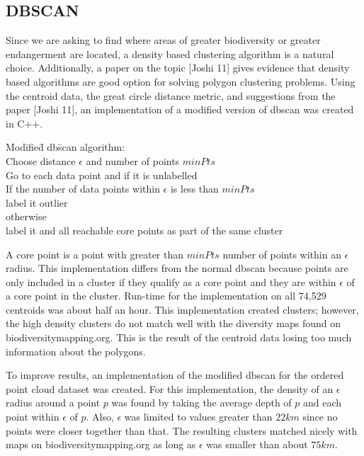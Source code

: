 \documentclass[11pt, fullpage,letterpaper]{article}
\renewcommand{\cite}[1]{[#1]}
\begin{document}
	\subsection{DBSCAN}
		Since we are asking to find where areas of greater biodiversity or greater endangerment are located, a density based clustering algorithm is a natural choice. Additionally, a paper on the topic \cite{Joshi 11} gives evidence that density based algorithms are good option for solving polygon clustering problems. Using the centroid data, the great circle distance metric, and suggestions from the paper \cite{Joshi 11}, an implementation of a modified version of dbscan was created in C++.
		\begin{tabbing}
			Mod\= ifie\= d db\= scan algorithm:\\
			\> Choose distance $\epsilon$ and number of points $minPts$\\
			\> Go to each data point and if it is unlabelled\\
			\> \> If the number of data points within $\epsilon$ is less than $minPts$\\
			\> \> \> label it outlier\\
			\> \> otherwise\\
			\> \> \> label it and all reachable core points as part of the same cluster\\
		\end{tabbing}

		A core point is a point with greater than $minPts$ number of points within an $\epsilon$ radius. This implementation differs from the normal dbscan because points are only included in a cluster if they qualify as a core point and they are within $\epsilon$ of a core point in the cluster. Run-time for the implementation on all  74,529 centroids was about half an hour. This implementation created clusters; however, the high density clusters do not match well with the diversity maps found on biodiversitymapping.org. This is the result of the centroid data losing too much information about the polygons.
		
		To improve results, an implementation of the modified dbscan for the ordered point cloud dataset was created. For this implementation, the density of an $\epsilon$ radius around a point $p$ was found by taking the average depth of $p$ and each point within $\epsilon$ of $p$. Also, $\epsilon$ was limited to values greater than $22km$ since no points were closer together than that. The resulting clusters matched nicely with maps on biodiversitymapping.org as long as $\epsilon$ was smaller than about $75km$.
		
\end{document}
